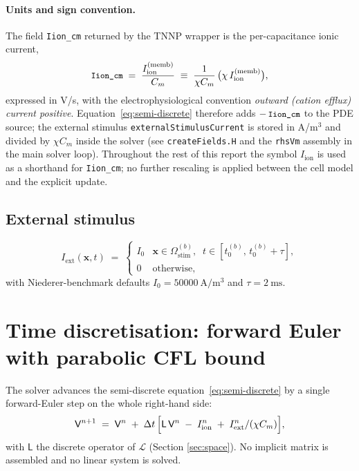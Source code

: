 \documentclass[11pt,a4paper]{article}
\newcommand{\Iion}{I_{\text{ion}}}
\newcommand{\Iext}{I_{\text{ext}}}
\newcommand{\Lop}{\mathsf{L}}
\newcommand{\code}[1]{\texttt{\small #1}}
\begin{document}
\paragraph{Units and sign convention.} The field \code{Iion\_cm}
returned by the TNNP wrapper is the per-capacitance ionic current,
\begin{equation*}
  \code{Iion\_cm}
   \;=\;
   \frac{I_{\text{ion}}^{\text{(memb)}}}{C_{m}}
   \;\equiv\;
   \frac{1}{\chi C_{m}}\,
   \bigl(\chi\, I_{\text{ion}}^{\text{(memb)}}\bigr),
\end{equation*}
expressed in V/s, with the electrophysiological convention
\emph{outward (cation efflux) current positive}.
Equation~\eqref{eq:semi-discrete} therefore adds
$-\,\code{Iion\_cm}$ to the PDE source; the external stimulus
\code{externalStimulusCurrent} is stored in A/m$^{3}$ and divided by
$\chi C_{m}$ inside the solver (see \code{createFields.H} and the
\code{rhsVm} assembly in the main solver loop). Throughout the rest
of this report the symbol $\Iion$ is used as a shorthand for
\code{Iion\_cm}; no further rescaling is applied between the cell
model and the explicit update.

\subsection{External stimulus}

\begin{equation}
  \Iext(\mathbf{x}, t) \;=\;
  \begin{cases}
    I_{0} & \mathbf{x} \in \Omega_{\text{stim}}^{(b)},
            \;\; t \in [t_{0}^{(b)},\, t_{0}^{(b)} + \tau], \\
    0     & \text{otherwise},
  \end{cases}
\end{equation}
with Niederer-benchmark defaults
$I_{0} = \SI{50000}{\ampere\per\meter\cubed}$ and
$\tau = \SI{2}{\milli\second}$.

\section{Time discretisation: forward Euler with parabolic CFL bound}
\label{sec:time}

The solver advances the semi-discrete
equation~\eqref{eq:semi-discrete} by a single forward-Euler step on
the whole right-hand side:
\begin{equation}
  \mathsf{V}^{n+1}
   \;=\;
   \mathsf{V}^{n}
   \;+\;
   \Delta t\,
   \Bigl[
     \Lop\,\mathsf{V}^{n}
     \;-\;\Iion^{n}
     \;+\;\Iext^{n}/(\chi C_{m})
   \Bigr],
   \label{eq:euler}
\end{equation}
with $\Lop$ the discrete operator of $\mathcal{L}$ (Section
\ref{sec:space}). No implicit matrix is assembled and no linear
system is solved.
\end{document}
